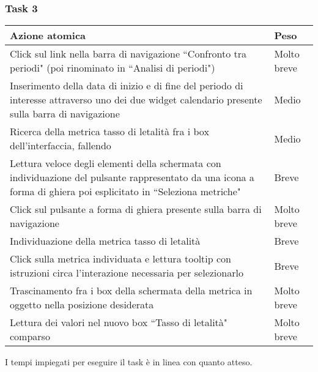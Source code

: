 \subsubsection{Task 3}
\label{sss:iaa-task-3}

{
\renewcommand{\arraystretch}{2}
\begin{longtable}[h]{| p{14cm} | p{2.5cm} |}
    \hline
    \textbf{Azione atomica} & \textbf{Peso} \\
    \hline
    \endhead
    Click sul link nella barra di navigazione ``Confronto tra periodi" (poi rinominato in ``Analisi di periodi") & Molto breve \\
    \hline
    Inserimento della data di inizio e di fine del periodo di interesse attraverso uno dei due widget calendario presente sulla barra di navigazione & Medio \\
    \hline
    Ricerca della metrica tasso di letalità fra i box dell'interfaccia, fallendo & Medio \\
    \hline
    Lettura veloce degli elementi della schermata con individuazione del pulsante rappresentato da una icona a forma di ghiera poi esplicitato in ``Seleziona metriche" & Breve \\
    \hline
    Click sul pulsante a forma di ghiera presente sulla barra di navigazione & Molto breve \\
    \hline
    Individuazione della metrica tasso di letalità & Breve \\
    \hline
    Click sulla metrica individuata e lettura tooltip con istruzioni circa l'interazione necessaria per selezionarlo & Breve \\
    \hline
    Trascinamento fra i box della schermata della metrica in oggetto nella posizione desiderata & Molto breve \\
    \hline
    Lettura dei valori nel nuovo box ``Tasso di letalità" comparso & Molto breve \\
    \hline
\end{longtable}
}
I tempi impiegati per eseguire il task è in linea con quanto atteso.
